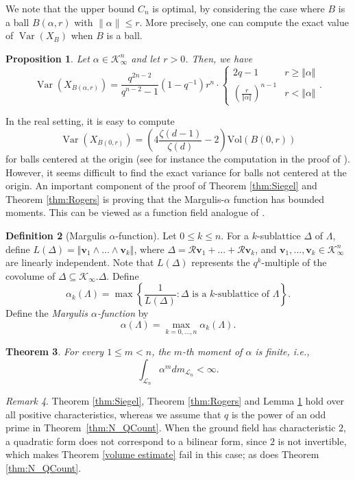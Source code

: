 \documentclass[11pt,a4paper,reqno]{amsart}
\def\vol{\mathrm{Vol}}
\newtheorem{theorem}{Theorem}[section]
\newtheorem{proposition}[theorem]{Proposition}
\theoremstyle{definition}
\newtheorem{definition}[theorem]{Definition}
\theoremstyle{remark}
\newtheorem{remark}[theorem]{Remark}
\numberwithin{equation}{section}
\begin{document}
We note that the upper bound $C_n$ is optimal, by considering the case where $B$ is a ball $B(\alpha, r)$ with $\|\alpha\|\le r$. More precisely, one can compute the exact value of $\operatorname{Var}(X_B)$ when $B$ is a ball.
\begin{proposition}
\label{lem:BallErr}
    Let $\alpha\in \mathcal{K}_{\infty}^n$ and let $r>0$. Then, we have
    $$\operatorname{Var}(X_{B(\alpha,r)})=\frac{q^{2n-2}}{q^{n-2}-1}(1-q^{-1})r^n\cdot \begin{cases}
            2q-1&r\geq \Vert \alpha\Vert\\
            \left(\frac{r}{\Vert \alpha\Vert}\right)^{n-1}&r<\Vert \alpha\Vert
        \end{cases}.$$
\end{proposition}
 In the real setting, it is easy to compute
\[
\operatorname{Var}\left(X_{B(0,r)}\right)=\left(4\frac {\zeta(d-1)} {\zeta(d)} - 2\right)\vol(B(0,r))
\]
for balls centered at the origin (see for instance the computation in the proof of \cite[Theorem 2.2]{AM2009}). However, it seems difficult to find the exact variance for balls not centered at the origin. 
\vspace{0.1in}
An important component of the proof of Theorem \ref{thm:Siegel} and Theorem \ref{thm:Rogers} is proving that the Margulis-$\alpha$ function has bounded moments. This can be viewed as a function field analogue of \cite[Lemma 3.10]{EMM}. 
\begin{definition}[Margulis $\alpha$-function]
    Let $0\leq k\leq n$. For a $k$-sublattice $\Delta$ of $\Lambda$, define $L(\Delta)=\Vert \mathbf{v}_1\wedge\dots\wedge\mathbf{v}_k\Vert$, where $\Delta=\mathcal{R}\mathbf{v}_1+\dots+\mathcal{R}\mathbf{v}_k$, and $\mathbf{v}_1,\dots,\mathbf{v}_k\in\mathcal{K}^n_{\infty}$ are linearly independent. Note that $L(\Delta)$ represents the $q^{k}$-multiple of the covolume of $\Delta\subseteq \mathcal K_\infty.\Delta$.  Define
    $$\alpha_k(\Lambda)=\max\left\{\frac{1}{L(\Delta)}:\Delta\text{ is a }k\text{-sublattice of }\Lambda\right\}.$$
    Define the \emph{Margulis $\alpha$-function} by
    $$\alpha(\Lambda)=\max_{k=0,\dots,n}\alpha_k(\Lambda).$$
\end{definition}
\begin{theorem}
\label{lem:alphaMoment}
    For every $1\leq m  < n$, the $m$-th moment of $\alpha$ is finite, i.e.,
    $$\int_{\mathcal{L}_n}\alpha^mdm_{\mathcal{L}_n}<\infty.$$
\end{theorem}
\begin{remark}
Theorem \ref{thm:Siegel}, Theorem \ref{thm:Rogers} and Lemma \ref{lem:BallErr} hold over all positive characteristics, whereas we assume that $q$ is the power of an odd prime in Theorem~\ref{thm:N_QCount}.
    When the ground field has characteristic $2$, a quadratic form does not correspond to a bilinear form, since $2$ is not invertible, which makes Theorem \ref{volume estimate} fail in this case; as does Theorem \ref{thm:N_QCount}.  
\end{remark}
\end{document}
